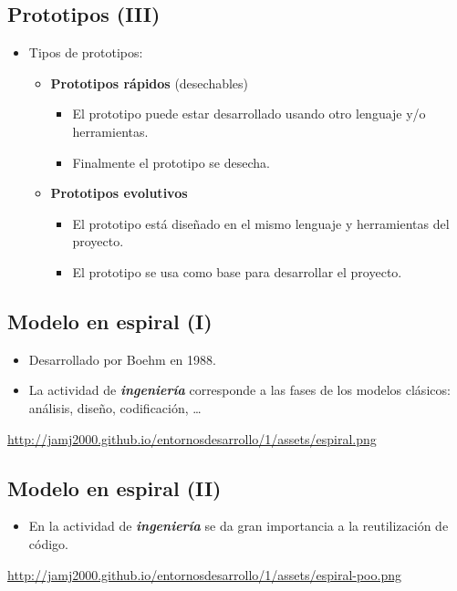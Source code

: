 \documentclass[a4paper]{article}
\begin{document}
\subsection{Prototipos (III)}
\label{prototipos-iii}
\begin{itemize}
\item Tipos de prototipos:
\begin{itemize}
\item \textbf{Prototipos rápidos} (desechables)
\begin{itemize}
\item El prototipo puede estar desarrollado usando otro lenguaje y/o
herramientas.
\item Finalmente el prototipo se desecha.
\end{itemize}
\item \textbf{Prototipos evolutivos}
\begin{itemize}
\item El prototipo está diseñado en el mismo lenguaje y herramientas del
proyecto.
\item El prototipo se usa como base para desarrollar el proyecto.
\end{itemize}
\end{itemize}
\end{itemize}
\subsection{Modelo en espiral (I)}
\label{modelo-en-espiral-i}
\begin{itemize}
\item Desarrollado por Boehm en 1988.
\item La actividad de \textbf{\emph{ingeniería}} corresponde a las fases de los modelos
clásicos: análisis, diseño, codificación, \ldots{}
\end{itemize}

\url{http://jamj2000.github.io/entornosdesarrollo/1/assets/espiral.png}
\subsection{Modelo en espiral (II)}
\label{modelo-en-espiral-ii}
\begin{itemize}
\item En la actividad de \textbf{\emph{ingeniería}} se da gran importancia a la
reutilización de código.
\end{itemize}

\url{http://jamj2000.github.io/entornosdesarrollo/1/assets/espiral-poo.png}
\end{document}
